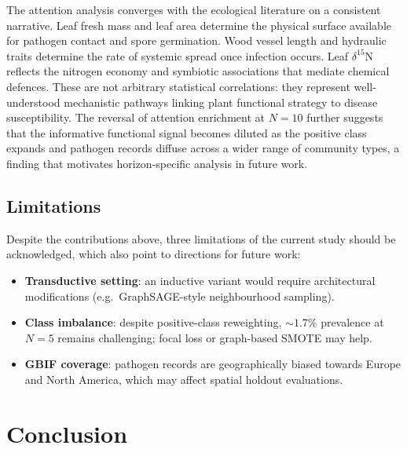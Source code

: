 \documentclass[a4paper,fleqn]{cas-sc}
\begin{document}
The attention analysis converges with the ecological literature on a consistent narrative. Leaf fresh mass and leaf area determine the physical surface available for pathogen contact and spore germination. Wood vessel length and hydraulic traits determine the rate of systemic spread once infection occurs. Leaf $\delta^{15}$N reflects the nitrogen economy and symbiotic associations that mediate chemical defences. These are not arbitrary statistical correlations: they represent well-understood mechanistic pathways linking plant functional strategy to disease susceptibility. The reversal of attention enrichment at $N=10$ further suggests that the informative functional signal becomes diluted as the positive class expands and pathogen records diffuse across a wider range of community types, a finding that motivates horizon-specific analysis in future work.

\subsection{Limitations}

Despite the contributions above, three limitations of the current study should be acknowledged, which also point to directions for future work:

\begin{itemize}[leftmargin=1.4em]
  \item \textbf{Transductive setting}: an inductive variant would require architectural modifications (e.g.\ GraphSAGE-style neighbourhood sampling).
  \item \textbf{Class imbalance}: despite positive-class reweighting, $\sim 1.7\%$ prevalence at $N=5$ remains challenging; focal loss \citep{lin2017} or graph-based SMOTE may help.
  \item \textbf{GBIF coverage}: pathogen records are geographically biased towards Europe and North America, which may affect spatial holdout evaluations.
\end{itemize}

\section{Conclusion}
\label{sec:conclusion}
\end{document}
